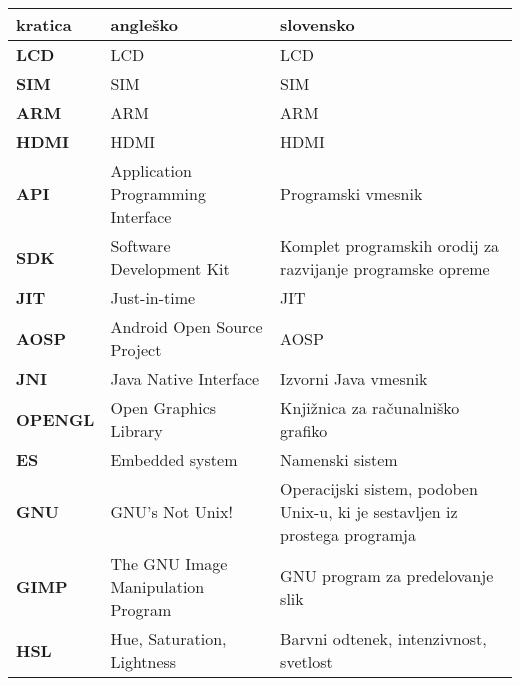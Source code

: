 \begin{tabular}{l|p{5cm}|p{6cm}}
  {\bf kratica} & {\bf angleško} & {\bf slovensko} \\ \hline
  {\bf LCD} & LCD & LCD \\
  {\bf SIM} & SIM & SIM \\
  {\bf ARM} & ARM & ARM \\
  {\bf HDMI} & HDMI & HDMI \\
  {\bf API} & Application Programming Interface & Programski vmesnik \\
  {\bf SDK} & Software Development Kit & Komplet programskih orodij za razvijanje programske opreme \\
  {\bf JIT} & Just-in-time & JIT \\
  {\bf AOSP} & Android Open Source Project & AOSP \\
  {\bf JNI} & Java Native Interface & Izvorni Java vmesnik \\
  {\bf OPENGL} & Open Graphics Library & Knjižnica za računalniško grafiko \\
  {\bf ES} & Embedded system & Namenski sistem \\
  {\bf GNU} & GNU's Not Unix! & Operacijski sistem, podoben Unix-u, ki je sestavljen iz prostega programja \\
  {\bf GIMP} & The GNU Image Manipulation Program & GNU program za predelovanje slik \\
  {\bf HSL} & Hue, Saturation, Lightness & Barvni odtenek, intenzivnost, svetlost
\end{tabular}
